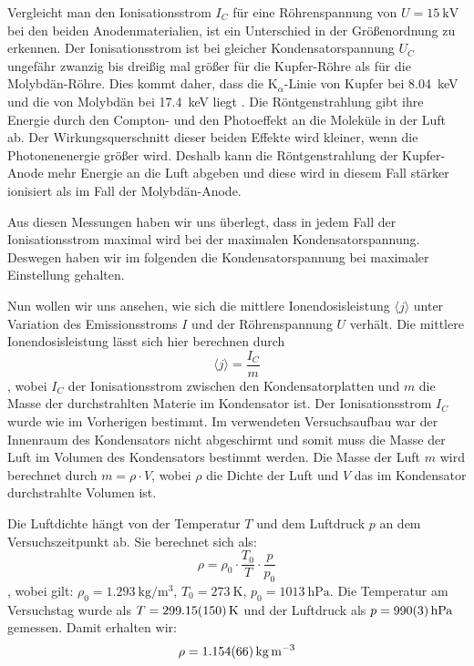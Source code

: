 \documentclass{article}
\begin{document}
Vergleicht man den Ionisationsstrom $I_C$ für eine Röhrenspannung von $U = \SI{15}{\kilo\volt}$ bei den beiden Anodenmaterialien, ist ein Unterschied in der Größenordnung zu erkennen.
Der Ionisationsstrom ist bei gleicher Kondensatorspannung $U_C$ ungefähr zwanzig bis dreißig mal größer für die Kupfer-Röhre als für die Molybdän-Röhre.
Dies kommt daher, dass die K$_\alpha$-Linie von Kupfer bei \SI{8,04}{\kilo\eV} und die von Molybdän bei \SI{17,4}{\kilo\eV} liegt \cite{CharakteristischeStrahlung}.
Die Röntgenstrahlung gibt ihre Energie durch den Compton- und den Photoeffekt an die Moleküle in der Luft ab.
Der Wirkungsquerschnitt dieser beiden Effekte wird kleiner, wenn die Photonenenergie größer wird.
Deshalb kann die Röntgenstrahlung der Kupfer-Anode mehr Energie an die Luft abgeben und diese wird in diesem Fall stärker ionisiert als im Fall der Molybdän-Anode.

Aus diesen Messungen haben wir uns überlegt, dass in jedem Fall der Ionisationsstrom maximal wird bei der maximalen Kondensatorspannung.
Deswegen haben wir im folgenden die Kondensatorspannung bei maximaler Einstellung gehalten.

Nun wollen wir uns ansehen, wie sich die mittlere Ionendosisleistung $\langle j \rangle$ unter Variation des Emissionsstroms $I$ und der Röhrenspannung $U$ verhält.
Die mittlere Ionendosisleistung lässt sich hier berechnen durch
\begin{displaymath}
    \langle j \rangle = \frac{I_C}{m}
\end{displaymath}
, wobei $I_C$ der Ionisationsstrom zwischen den Kondensatorplatten und $m$ die Masse der durchstrahlten Materie im Kondensator ist.
Der Ionisationsstrom $I_C$ wurde wie im Vorherigen bestimmt. 
Im verwendeten Versuchsaufbau war der Innenraum des Kondensators nicht abgeschirmt und somit muss die Masse der Luft im Volumen des Kondensators bestimmt werden.
Die Masse der Luft $m$ wird berechnet durch $m = \rho \cdot V$, wobei $\rho$ die Dichte der Luft und $V$ das im Kondensator durchstrahlte Volumen ist.

Die Luftdichte hängt von der Temperatur $T$ und dem Luftdruck $p$ an dem Versuchszeitpunkt ab.
Sie berechnet sich als:
\begin{displaymath}
    \rho = \rho_0 \cdot \frac{T_0}{T} \cdot \frac{p}{p_0}
\end{displaymath}
, wobei gilt: $\rho_0 = \SI{1,293}{\kilo\gram\per\meter\cubed}$, $T_0 = \SI{273}{\kelvin}$, $p_0 = \SI{1013}{\hecto\pascal}$.
Die Temperatur am Versuchstag wurde als $T = \SI{299,15 \pm 1,5}{\kelvin}$ und der Luftdruck als $p = \SI{990 \pm 3}{\hecto\pascal}$ gemessen.
Damit erhalten wir:
\begin{displaymath}
    \rho = \SI{1,154 \pm 0,066}{\kilo\gram\per\meter\cubed}
\end{displaymath}
\end{document}
